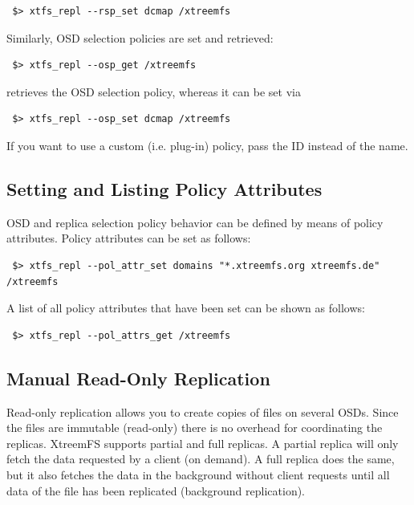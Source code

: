 \documentclass[a4paper,10pt]{book}
\begin{document}
\begin{verbatim}
 $> xtfs_repl --rsp_set dcmap /xtreemfs
\end{verbatim}

Similarly, OSD selection policies are set and retrieved:

\begin{verbatim}
 $> xtfs_repl --osp_get /xtreemfs
\end{verbatim}

retrieves the OSD selection policy, whereas it can be set via

\begin{verbatim}
 $> xtfs_repl --osp_set dcmap /xtreemfs
\end{verbatim}

If you want to use a custom (i.e. plug-in) policy, pass the ID instead of the name.

\subsection{Setting and Listing Policy Attributes}

OSD and replica selection policy behavior can be defined by means of policy attributes. Policy attributes can be set as follows:

\begin{verbatim}
 $> xtfs_repl --pol_attr_set domains "*.xtreemfs.org xtreemfs.de" /xtreemfs
\end{verbatim}

A list of all policy attributes that have been set can be shown as follows:

\begin{verbatim}
 $> xtfs_repl --pol_attrs_get /xtreemfs
\end{verbatim}

\subsection{Manual Read-Only Replication}

Read-only replication allows you to create copies of files on several OSDs. Since the files are immutable (read-only) there is no overhead for coordinating the replicas. XtreemFS supports partial and full replicas.
A partial replica will only fetch the data requested by a client (on demand). A full replica does the same, but it also fetches the data in the background without client requests until all data of the file has been replicated (background replication).
\end{document}
